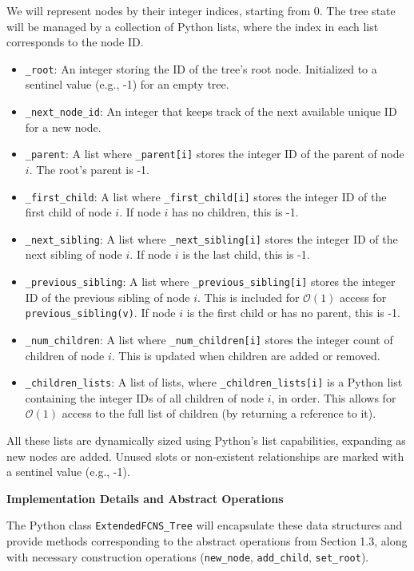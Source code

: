 \documentclass{article}
\begin{document}
We will represent nodes by their integer indices, starting from $0$. The tree state will be managed by a collection of Python lists, where the index in each list corresponds to the node ID.
\begin{itemize}
    \item \texttt{\_root}: An integer storing the ID of the tree's root node. Initialized to a sentinel value (e.g., -1) for an empty tree.
    \item \texttt{\_next\_node\_id}: An integer that keeps track of the next available unique ID for a new node.
    \item \texttt{\_parent}: A list where \texttt{\_parent[i]} stores the integer ID of the parent of node $i$. The root's parent is -1.
    \item \texttt{\_first\_child}: A list where \texttt{\_first\_child[i]} stores the integer ID of the first child of node $i$. If node $i$ has no children, this is -1.
    \item \texttt{\_next\_sibling}: A list where \texttt{\_next\_sibling[i]} stores the integer ID of the next sibling of node $i$. If node $i$ is the last child, this is -1.
    \item \texttt{\_previous\_sibling}: A list where \texttt{\_previous\_sibling[i]} stores the integer ID of the previous sibling of node $i$. This is included for $\mathcal{O}(1)$ access for \texttt{previous\_sibling(v)}. If node $i$ is the first child or has no parent, this is -1.
    \item \texttt{\_num\_children}: A list where \texttt{\_num\_children[i]} stores the integer count of children of node $i$. This is updated when children are added or removed.
    \item \texttt{\_children\_lists}: A list of lists, where \texttt{\_children\_lists[i]} is a Python list containing the integer IDs of all children of node $i$, in order. This allows for $\mathcal{O}(1)$ access to the full list of children (by returning a reference to it).
\end{itemize}
All these lists are dynamically sized using Python's list capabilities, expanding as new nodes are added. Unused slots or non-existent relationships are marked with a sentinel value (e.g., -1).

\textbf{Implementation Details and Abstract Operations}

The Python class \texttt{ExtendedFCNS\_Tree} will encapsulate these data structures and provide methods corresponding to the abstract operations from Section 1.3, along with necessary construction operations (\texttt{new\_node}, \texttt{add\_child}, \texttt{set\_root}).
\end{document}
